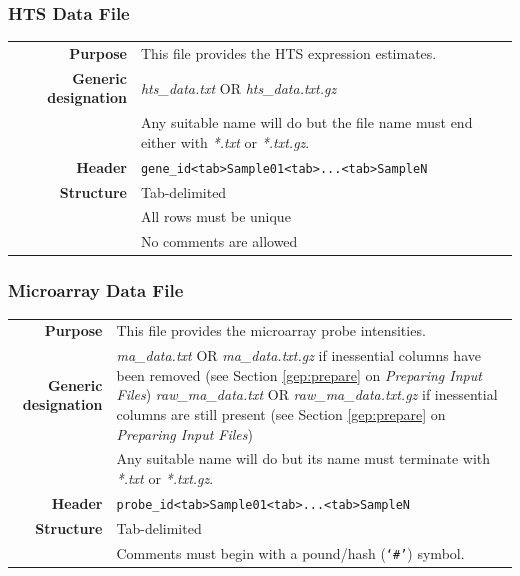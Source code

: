 \documentclass[a4paper,12pt]{article}
\begin{document}
\subsubsection{HTS Data File}
\label{gep:hts}

\begin{tabular}{rp{12cm}}
\textbf{Purpose} & This file provides the HTS expression estimates.\\
\textbf{Generic designation} & \textit{hts\_data.txt} OR \textit{hts\_data.txt.gz} \\
  & Any suitable name will do but the file name must end either with \textit{*.txt} or \textit{*.txt.gz}. \\
\textbf{Header} & \texttt{gene\_id\textless tab\textgreater Sample01\textless tab\textgreater...\textless tab\textgreater SampleN} \\
\textbf{Structure} & Tab-delimited \\
  & All rows must be unique \\
  & No comments are allowed \\
\end{tabular}

\subsubsection{Microarray Data File}
\label{gep:microarray}

\begin{tabular}{rp{12cm}}
\textbf{Purpose} & This file provides the microarray probe intensities. \\
\textbf{Generic designation} & \textit{ma\_data.txt} OR \textit{ma\_data.txt.gz} if inessential columns have been removed (see Section \ref{gep:prepare} on \textit{Preparing Input Files})
\textit{raw\_ma\_data.txt} OR \textit{raw\_ma\_data.txt.gz} if inessential columns are still present (see Section \ref{gep:prepare} on \textit{Preparing Input Files}) \\
  & Any suitable name will do but its name must terminate with \textit{*.txt} or \textit{*.txt.gz}. \\
\textbf{Header} & \texttt{probe\_id\textless tab\textgreater Sample01\textless tab\textgreater...\textless tab\textgreater SampleN} \\
\textbf{Structure} & Tab-delimited \\
  & Comments must begin with a pound/hash (\texttt{`\#'}) symbol. \\
\end{tabular}
\end{document}
